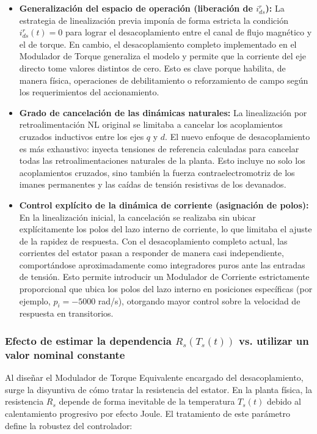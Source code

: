 \documentclass[12pt, a4paper,journal, onecolumn, compsoc]{IEEEtran}
\begin{document}
\begin{itemize}
    \item \textbf{Generalización del espacio de operación (liberación de $i_{ds}^r$):} 
    La estrategia de linealización previa imponía de forma estricta la condición $i_{ds}^r(t)=0$ para lograr el desacoplamiento entre el canal de flujo magnético y el de torque. En cambio, el desacoplamiento completo implementado en el Modulador de Torque generaliza el modelo y permite que la corriente del eje directo tome valores distintos de cero. Esto es clave porque habilita, de manera física, operaciones de debilitamiento o reforzamiento de campo según los requerimientos del accionamiento.
    
    \item \textbf{Grado de cancelación de las dinámicas naturales:} 
    La linealización por retroalimentación NL original se limitaba a cancelar los acoplamientos cruzados inductivos entre los ejes $q$ y $d$. El nuevo enfoque de desacoplamiento es más exhaustivo: inyecta tensiones de referencia calculadas para cancelar todas las retroalimentaciones naturales de la planta. Esto incluye no solo los acoplamientos cruzados, sino también la fuerza contraelectromotriz de los imanes permanentes y las caídas de tensión resistivas de los devanados.
    
    \item \textbf{Control explícito de la dinámica de corriente (asignación de polos):} 
    En la linealización inicial, la cancelación se realizaba sin ubicar explícitamente los polos del lazo interno de corriente, lo que limitaba el ajuste de la rapidez de respuesta. Con el desacoplamiento completo actual, las corrientes del estator pasan a responder de manera casi independiente, comportándose aproximadamente como integradores puros ante las entradas de tensión. Esto permite introducir un Modulador de Corriente estrictamente proporcional que ubica los polos del lazo interno en posiciones específicas (por ejemplo, $p_i=-5000$ rad/s), otorgando mayor control sobre la velocidad de respuesta en transitorios.
\end{itemize}


\subsubsection{Efecto de estimar la dependencia $R_s(T_s(t))$ vs. utilizar un valor nominal constante}

Al diseñar el Modulador de Torque Equivalente encargado del desacoplamiento, surge la disyuntiva de cómo tratar la resistencia del estator. En la planta física, la resistencia $R_s$ depende de forma inevitable de la temperatura $T_s(t)$ debido al calentamiento progresivo por efecto Joule. El tratamiento de este parámetro define la robustez del controlador:
\end{document}
